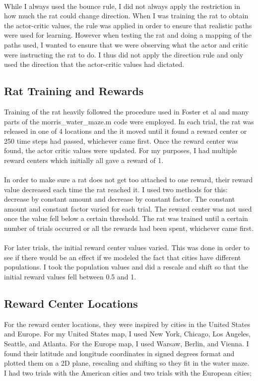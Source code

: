 \documentclass[conference]{IEEEtran}
\begin{document}
\\
While I always used the bounce rule, I did not always apply the restriction in how much the rat could change direction. When I was training the rat to obtain the actor-critic values, the rule was applied in order to ensure that realistic paths were used for learning. However when testing the rat and doing a mapping of the paths used, I wanted to ensure that we were observing what the actor and critic were instructing the rat to do. I thus did not apply the direction rule and only used the direction that the actor-critic values had dictated. 

\subsection{Rat Training and Rewards}

Training of the rat heavily followed the procedure used in Foster et al \cite{foster} and many parts of the morris\_water\_maze.m code were employed. In each trial, the rat was released in one of 4 locations and the it moved until it found a reward center or 250 time steps had passed, whichever came first. Once the reward center was found, the actor critic values were updated. For my purposes, I had multiple reward centers which initially all gave a reward of 1.\\
\\
In order to make sure a rat does not get too attached to one reward, their reward value decreased each time the rat reached it. I used two methods for this: decrease by constant amount and decrease by constant factor. The constant amount and constant factor varied for each trial. The reward center was not used once the value fell below a certain threshold. The rat was trained until a certain number of trials occurred or all the rewards had been spent, whichever came first. \\
\\
For later trials, the initial reward center values varied. This was done in order to see if there would be an effect if we modeled the fact that cities have different populations. I took the population values and did a rescale and shift so that the initial reward values fell between 0.5 and 1. 

\subsection{Reward Center Locations}
For the reward center locations, they were inspired by cities in the United States and Europe. For my United States map, I used New York, Chicago, Los Angeles, Seattle, and Atlanta. For the Europe map, I used Warsaw, Berlin, and Vienna. I found their latitude and longitude coordinates in signed degrees format and plotted them on a 2D plane, rescaling and shifting so they fit in the water maze. I had two trials with the American cities and two trials with the European cities;
\end{document}
